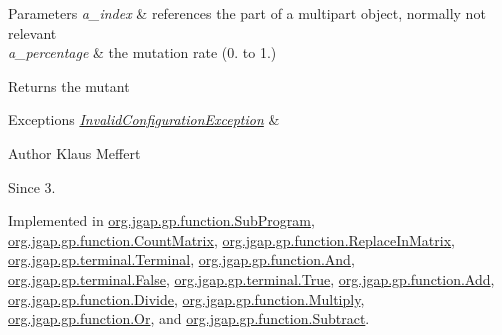 \begin{DoxyParams}{Parameters}
{\em a\-\_\-index} & references the part of a multipart object, normally not relevant \\
\hline
{\em a\-\_\-percentage} & the mutation rate (0. to 1.) \\
\hline
\end{DoxyParams}
\begin{DoxyReturn}{Returns}
the mutant 
\end{DoxyReturn}

\begin{DoxyExceptions}{Exceptions}
{\em \hyperlink{classorg_1_1jgap_1_1_invalid_configuration_exception}{Invalid\-Configuration\-Exception}} & \\
\hline
\end{DoxyExceptions}
\begin{DoxyAuthor}{Author}
Klaus Meffert 
\end{DoxyAuthor}
\begin{DoxySince}{Since}
3. 
\end{DoxySince}


Implemented in \hyperlink{classorg_1_1jgap_1_1gp_1_1function_1_1_sub_program_a3eb014168eb8b158721776f35f0692e5}{org.\-jgap.\-gp.\-function.\-Sub\-Program}, \hyperlink{classorg_1_1jgap_1_1gp_1_1function_1_1_count_matrix_a69007bff3648ff944611ff9dc2a0d84f}{org.\-jgap.\-gp.\-function.\-Count\-Matrix}, \hyperlink{classorg_1_1jgap_1_1gp_1_1function_1_1_replace_in_matrix_afd62d5f2b688e62992987d8ced904bc1}{org.\-jgap.\-gp.\-function.\-Replace\-In\-Matrix}, \hyperlink{classorg_1_1jgap_1_1gp_1_1terminal_1_1_terminal_aa83c3694e0ae92eee2d50696d693ba23}{org.\-jgap.\-gp.\-terminal.\-Terminal}, \hyperlink{classorg_1_1jgap_1_1gp_1_1function_1_1_and_aaaf346d217ba4d386463aa9c1293dc7f}{org.\-jgap.\-gp.\-function.\-And}, \hyperlink{classorg_1_1jgap_1_1gp_1_1terminal_1_1_false_a77eae169a5f78f191f1a6cf5319eb884}{org.\-jgap.\-gp.\-terminal.\-False}, \hyperlink{classorg_1_1jgap_1_1gp_1_1terminal_1_1_true_a916567d5d3517322184070c9fa468c34}{org.\-jgap.\-gp.\-terminal.\-True}, \hyperlink{classorg_1_1jgap_1_1gp_1_1function_1_1_add_a9f4e9760301a72c2c7452452778eb236}{org.\-jgap.\-gp.\-function.\-Add}, \hyperlink{classorg_1_1jgap_1_1gp_1_1function_1_1_divide_a94363ce64fcba06e32202e3e547c8e02}{org.\-jgap.\-gp.\-function.\-Divide}, \hyperlink{classorg_1_1jgap_1_1gp_1_1function_1_1_multiply_a040f94653daf42243876c1149e0a7e7c}{org.\-jgap.\-gp.\-function.\-Multiply}, \hyperlink{classorg_1_1jgap_1_1gp_1_1function_1_1_or_a6d61234e177438cb76709a9d6a93e361}{org.\-jgap.\-gp.\-function.\-Or}, and \hyperlink{classorg_1_1jgap_1_1gp_1_1function_1_1_subtract_a0750c586ef847b65beacff4ec4da3657}{org.\-jgap.\-gp.\-function.\-Subtract}.



